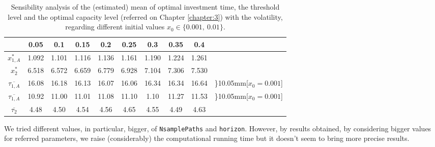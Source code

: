 \begin{table}[!ht]
	\centering
	\caption{Sensibility analysis of the (estimated) mean of optimal investment time, the threshold level and the optimal capacity level (referred on Chapter \ref{chapter:3}) with the volatility, regarding different initial values $x_0 \in \{0.001, \ 0.01\}$.}
	\begin{tabular}{c|ccccccccc}
		\hline
		\text{ $\sigma $ } & 0.05 & 0.1 & 0.15 & 0.2 & 0.25 & 0.3 & 0.35 & 0.4 \\ \hline
		$x_{1,A}^*$ & 1.092 & 1.101 & 1.116 & 1.136 & 1.161 & 1.190 & 1.224 & 1.261   \\
		$x_2^*$ & 6.518 & 6.572 & 6.659 & 6.779 & 6.928 & 7.104 & 7.306 & 7.530  \\ \hline
		$\overline{\tau _{1,A}}$ & 16.08 & 16.18 & 16.13 & 16.07 & 16.06 & 16.34 & 16.34 & 16.64  & \rdelim\}{1}{0.05mm}[$x_0=0.001$] \\
		$\overline{\tau _{1,A}}$ & 10.92 & 11.00 & 11.01 &  11.08 & 11.10 & 1.10 & 11.27 & 11.53 & \rdelim\}{1}{0.05mm}[$x_0=0.001$]  \\ \hline
		$\overline{\tau _2}$ & 4.48 & 4.50 & 4.54 & 4.56 & 4.65 & 4.55 & 4.49 & 4.63   \\ \hline
	\end{tabular}
\label{tab:vol_3}
\end{table}






 We tried different values, in particular, bigger, of \texttt{NsamplePaths} and \texttt{horizon}. However, by results obtained, by considering bigger values for referred parameters, we raise (considerably) the computational running time but it doesn't seem to bring more precise results.
